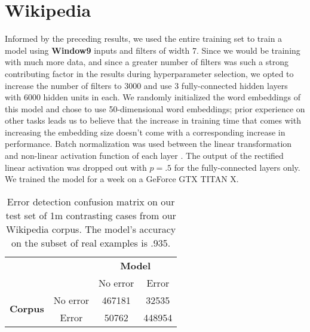 \section{Wikipedia}
\label{sec:PrepositionExperimentsWikipedia}

Informed by the preceding results, we used the entire training set to train a model using \textbf{Window9} inputs and filters of width 7.  Since we would be training with much more data, and since a greater number of filters was such a strong contributing factor in the results during hyperparameter selection, we opted to increase the number of filters to 3000 and use 3 fully-connected hidden layers with 6000 hidden units in each.  We randomly initialized the word embeddings of this model and chose to use 50-dimensional word embeddings; prior experience on other tasks leads us to believe that the increase in training time that comes with increasing the embedding size doesn't come with a corresponding increase in performance.  Batch normalization was used between the linear transformation and non-linear activation function of each layer \cite{ioffe2015batch}.  The output of the rectified linear activation was dropped out with $p=.5$ for the fully-connected layers only.  We trained the model for a week on a GeForce GTX TITAN X. 


\begin{table}
\centering
\begin{tabular}{cccc}
                           & & \multicolumn{2}{c}{\textbf{Model}} \\
                           \cline{3-4}
                           & & No error & Error \\
\hline
\multirow{2}{*}{\textbf{Corpus}} & No error & 467181   & 32535 \\
                                 & Error    & 50762    & 448954 \\
\end{tabular}
\caption{Error detection confusion matrix on our test set of 1m contrasting cases from our Wikipedia corpus.  The model's accuracy on the subset of real examples is .935.}
\label{tab:DetectionConfusionMatrix}
\end{table}


